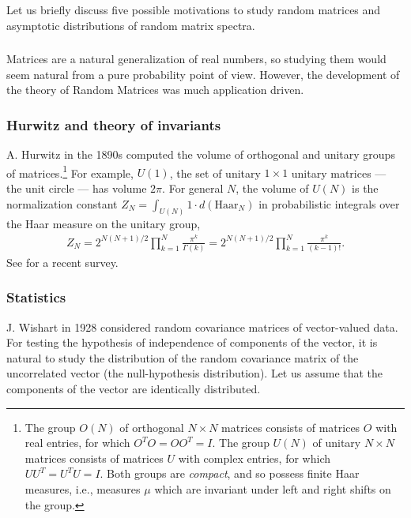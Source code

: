 \documentclass[letterpaper,11pt,oneside,reqno]{amsart}
\numberwithin{equation}{section}
\theoremstyle{definition}
\begin{document}
Let us briefly discuss five possible motivations to study random matrices and asymptotic distributions of 
random matrix spectra.

\subsubsection{}

Matrices are a natural generalization of real numbers, so studying them would
seem natural from a  pure probability point of view. However, the development
of the theory of Random Matrices was much application driven.

\subsubsection{Hurwitz and theory of invariants} 

A. Hurwitz in the 1890s \cite{Hurwitz1897} computed the volume of orthogonal
and unitary groups of matrices.\footnote{The group $O(N)$
of orthogonal $N\times N$ matrices consists of matrices $O$ with real entries, 
for which $O^{T}O=OO^{T}=I$.
The group $U(N)$ of unitary 
$N\times N$ matrices consists of matrices $U$ with complex entries, 
for which $UU^{T}=U^{T}U=I$.
Both groups are \emph{compact}, and so possess finite Haar measures,
i.e., measures $\mu$ which are invariant under left and right shifts on the group.} 
For example, $U(1)$, the set of unitary
$1\times 1$ unitary matrices --- the unit circle --- has volume $2\pi$.  For general $N$, the
volume of $U(N)$ is the normalization constant $Z_N=\int_{U(N)} 1\cdot d(\mathrm{Haar}_N)$ in probabilistic integrals
over the Haar measure on the unitary group,
\begin{align*}
  	Z_N=2^{N(N+1)/2}\prod_{k=1}^{N}\frac{\pi^{k}}{\Gamma(k)}=2^{N(N+1)/2}\prod_{k=1}^{N}\frac{\pi^{k}}{(k-1)!}.
\end{align*}
See
\cite{diaconis2015hurwitz} for a recent survey.

\subsubsection{Statistics} 

J. Wishart in 1928 \cite{wishart1928generalised} considered random covariance matrices of 
vector-valued data. For testing the hypothesis of independence of components of the vector,
it is natural to study the distribution of the random covariance matrix 
of the uncorrelated vector (the null-hypothesis distribution). Let us assume that the components
of the vector are identically distributed.
\end{document}
